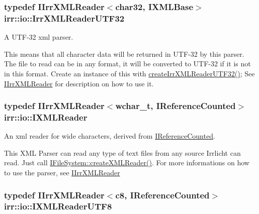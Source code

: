 \subsubsection[{\texorpdfstring{Irr\+X\+M\+L\+Reader\+U\+T\+F32}{IrrXMLReaderUTF32}}]{\setlength{\rightskip}{0pt plus 5cm}typedef {\bf I\+Irr\+X\+M\+L\+Reader}$<${\bf char32}, {\bf I\+X\+M\+L\+Base}$>$ {\bf irr\+::io\+::\+Irr\+X\+M\+L\+Reader\+U\+T\+F32}}\hypertarget{namespaceirr_1_1io_a70f411ff403636fb5c4e9becb090d5ec}{}\label{namespaceirr_1_1io_a70f411ff403636fb5c4e9becb090d5ec}


A U\+T\+F-\/32 xml parser. 

This means that all character data will be returned in U\+T\+F-\/32 by this parser. The file to read can be in any format, it will be converted to U\+T\+F-\/32 if it is not in this format. Create an instance of this with \hyperlink{namespaceirr_1_1io_ae05bf7ee342431ea8c98fb98e75b974a}{create\+Irr\+X\+M\+L\+Reader\+U\+T\+F32()}; See \hyperlink{classirr_1_1io_1_1IIrrXMLReader}{I\+Irr\+X\+M\+L\+Reader} for description on how to use it. 
\subsubsection[{\texorpdfstring{I\+X\+M\+L\+Reader}{IXMLReader}}]{\setlength{\rightskip}{0pt plus 5cm}typedef {\bf I\+Irr\+X\+M\+L\+Reader}$<$wchar\+\_\+t, {\bf I\+Reference\+Counted}$>$ {\bf irr\+::io\+::\+I\+X\+M\+L\+Reader}}\hypertarget{namespaceirr_1_1io_a9dc6291fb7e4c73155a3e3c8339f9bff}{}\label{namespaceirr_1_1io_a9dc6291fb7e4c73155a3e3c8339f9bff}


An xml reader for wide characters, derived from \hyperlink{classirr_1_1IReferenceCounted}{I\+Reference\+Counted}. 

This X\+ML Parser can read any type of text files from any source Irrlicht can read. Just call \hyperlink{classirr_1_1io_1_1IFileSystem_a167c9fa159d16ee5c56c074636b0865e}{I\+File\+System\+::create\+X\+M\+L\+Reader()}. For more informations on how to use the parser, see \hyperlink{classirr_1_1io_1_1IIrrXMLReader}{I\+Irr\+X\+M\+L\+Reader} 
\subsubsection[{\texorpdfstring{I\+X\+M\+L\+Reader\+U\+T\+F8}{IXMLReaderUTF8}}]{\setlength{\rightskip}{0pt plus 5cm}typedef {\bf I\+Irr\+X\+M\+L\+Reader}$<${\bf c8}, {\bf I\+Reference\+Counted}$>$ {\bf irr\+::io\+::\+I\+X\+M\+L\+Reader\+U\+T\+F8}}\hypertarget{namespaceirr_1_1io_a2dedc8156931082e6b147b562195e310}{}\label{namespaceirr_1_1io_a2dedc8156931082e6b147b562195e310}


